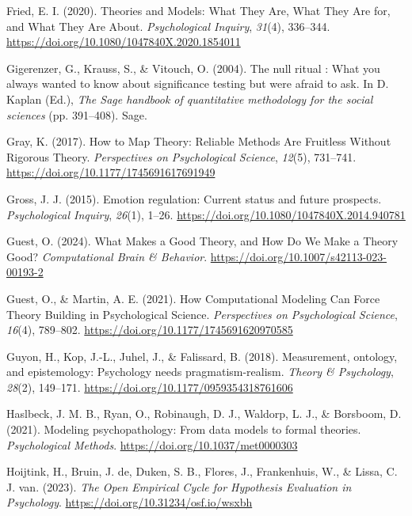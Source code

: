 \documentclass[
  man, noextraspace,floatsintext]{apa7}
\newlength{\cslhangindent}
\newenvironment{CSLReferences}[2] %
 {\begin{list}{}{%
  \setlength{\itemindent}{0pt}
  \setlength{\leftmargin}{0pt}
  \setlength{\parsep}{0pt}
  \ifodd #1
   \setlength{\leftmargin}{\cslhangindent}
   \setlength{\itemindent}{-1\cslhangindent}
  \fi
  \setlength{\itemsep}{#2\baselineskip}}}
 {\end{list}}
\begin{document}
\begin{CSLReferences}{1}{0}
Fried, E. I. (2020). Theories and {Models}: {What They Are}, {What They Are} for, and {What They Are About}. \emph{Psychological Inquiry}, \emph{31}(4), 336--344. \url{https://doi.org/10.1080/1047840X.2020.1854011}

Gigerenzer, G., Krauss, S., \& Vitouch, O. (2004). The null ritual : {What} you always wanted to know about significance testing but were afraid to ask. In D. Kaplan (Ed.), \emph{The {Sage} handbook of quantitative methodology for the social sciences} (pp. 391--408). Sage.

Gray, K. (2017). How to {Map Theory}: {Reliable Methods Are Fruitless Without Rigorous Theory}. \emph{Perspectives on Psychological Science}, \emph{12}(5), 731--741. \url{https://doi.org/10.1177/1745691617691949}

Gross, J. J. (2015). Emotion regulation: {Current} status and future prospects. \emph{Psychological Inquiry}, \emph{26}(1), 1--26. \url{https://doi.org/10.1080/1047840X.2014.940781}

Guest, O. (2024). What {Makes} a {Good Theory}, and {How Do We Make} a {Theory Good}? \emph{Computational Brain \& Behavior}. \url{https://doi.org/10.1007/s42113-023-00193-2}

Guest, O., \& Martin, A. E. (2021). How {Computational Modeling Can Force Theory Building} in {Psychological Science}. \emph{Perspectives on Psychological Science}, \emph{16}(4), 789--802. \url{https://doi.org/10.1177/1745691620970585}

Guyon, H., Kop, J.-L., Juhel, J., \& Falissard, B. (2018). Measurement, ontology, and epistemology: {Psychology} needs pragmatism-realism. \emph{Theory \& Psychology}, \emph{28}(2), 149--171. \url{https://doi.org/10.1177/0959354318761606}

Haslbeck, J. M. B., Ryan, O., Robinaugh, D. J., Waldorp, L. J., \& Borsboom, D. (2021). Modeling psychopathology: {From} data models to formal theories. \emph{Psychological Methods}. \url{https://doi.org/10.1037/met0000303}

Hoijtink, H., Bruin, J. de, Duken, S. B., Flores, J., Frankenhuis, W., \& Lissa, C. J. van. (2023). \emph{The {Open Empirical Cycle} for {Hypothesis Evaluation} in {Psychology}}. \url{https://doi.org/10.31234/osf.io/wsxbh}


\end{CSLReferences}
\end{document}
